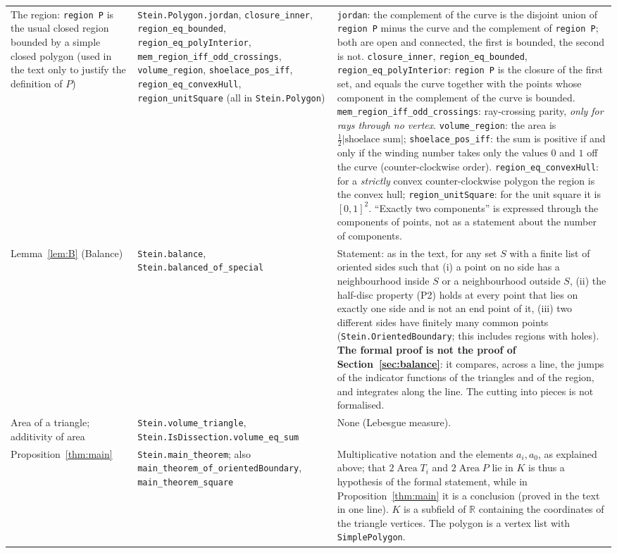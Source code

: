 \documentclass[11pt]{article}
\theoremstyle{definition}
\newcommand{\R}{\mathbb{R}}
\newcommand{\Area}{\operatorname{Area}}
\newcommand{\tL}[1]{\texttt{#1}}
\begin{document}
{\begin{longtable}{@{}>{\raggedright\arraybackslash}p{3.5cm}>{\raggedright\arraybackslash}p{4.6cm}>{\raggedright\arraybackslash}p{6.6cm}@{}}
The region: \tL{region P} is the usual closed region bounded by a simple closed polygon (used in the text only to justify the definition of $P$) & \tL{Stein.Polygon.jordan}, \tL{closure\_inner}, \tL{region\_eq\_bounded}, \tL{region\_eq\_polyInterior}, \tL{mem\_region\_iff\_\allowbreak odd\_crossings}, \tL{volume\_region}, \tL{shoelace\_pos\_iff}, \tL{region\_eq\_convexHull}, \tL{region\_unitSquare} (all in \tL{Stein.Polygon}) & \tL{jordan}: the complement of the curve is the disjoint union of \tL{region P} minus the curve and the complement of \tL{region P}; both are open and connected, the first is bounded, the second is not. \tL{closure\_inner}, \tL{region\_eq\_bounded}, \tL{region\_eq\_polyInterior}: \tL{region P} is the closure of the first set, and equals the curve together with the points whose component in the complement of the curve is bounded. \tL{mem\_region\_iff\_odd\_crossings}: ray-crossing parity, \emph{only for rays through no vertex}. \tL{volume\_region}: the area is $\tfrac12|\text{shoelace sum}|$; \tL{shoelace\_pos\_iff}: the sum is positive if and only if the winding number takes only the values $0$ and $1$ off the curve (counter-clockwise order). \tL{region\_eq\_convexHull}: for a \emph{strictly} convex counter-clockwise polygon the region is the convex hull; \tL{region\_unitSquare}: for the unit square it is $[0,1]^2$. ``Exactly two components'' is expressed through the components of points, not as a statement about the number of components.\\
Lemma~\ref{lem:B} (Balance) & \tL{Stein.balance}, \tL{Stein.balanced\_\allowbreak of\_special} & Statement: as in the text, for any set $S$ with a finite list of oriented sides such that (i) a point on no side has a neighbourhood inside $S$ or a neighbourhood outside $S$, (ii) the half-disc property (P2) holds at every point that lies on exactly one side and is not an end point of it, (iii) two different sides have finitely many common points (\tL{Stein.OrientedBoundary}; this includes regions with holes). \textbf{The formal proof is not the proof of Section~\ref{sec:balance}}: it compares, across a line, the jumps of the indicator functions of the triangles and of the region, and integrates along the line. The cutting into pieces is not formalised.\\
Area of a triangle; additivity of area & \tL{Stein.volume\_triangle}, \tL{Stein.IsDissection.\allowbreak volume\_eq\_sum} & None (Lebesgue measure).\\
Proposition~\ref{thm:main} & \tL{Stein.main\_theorem}; also \tL{main\_theorem\_\allowbreak of\_orientedBoundary}, \tL{main\_theorem\_square} & Multiplicative notation and the elements $a_i,a_0$, as explained above; that $2\Area T_i$ and $2\Area P$ lie in $K$ is thus a hypothesis of the formal statement, while in Proposition~\ref{thm:main} it is a conclusion (proved in the text in one line). $K$ is a subfield of $\R$ containing the coordinates of the triangle vertices. The polygon is a vertex list with \tL{SimplePolygon}.\\

\end{longtable}}
\end{document}
